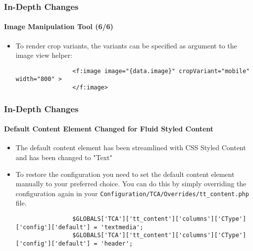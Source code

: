 \begin{frame}[fragile]
	\frametitle{In-Depth Changes}
	\framesubtitle{Image Manipulation Tool (6/6)}

	\lstset{basicstyle=\smaller\ttfamily}

	\begin{itemize}
		\item To render crop variants, the variants can be specified as argument to the image view helper:

			\begin{lstlisting}
				<f:image image="{data.image}" cropVariant="mobile" width="800" >
				</f:image>
			\end{lstlisting}

	\end{itemize}

\end{frame}


\begin{frame}[fragile]
	\frametitle{In-Depth Changes}
	\framesubtitle{Default Content Element Changed for Fluid Styled Content}

	\lstset{basicstyle=\tiny\ttfamily}

	\begin{itemize}
		\item The default content element has been streamlined with CSS Styled Content and has been changed to "Text"
		\item To restore the configuration you need to set the default content element manually to your preferred choice.
			You can do this by simply overriding the configuration again in your
			\texttt{Configuration/TCA/Overrides/tt\_content.php} file.

			\begin{lstlisting}
				$GLOBALS['TCA']['tt_content']['columns']['CType']['config']['default'] = 'textmedia';
				$GLOBALS['TCA']['tt_content']['columns']['CType']['config']['default'] = 'header';
			\end{lstlisting}

	\end{itemize}

\end{frame}

